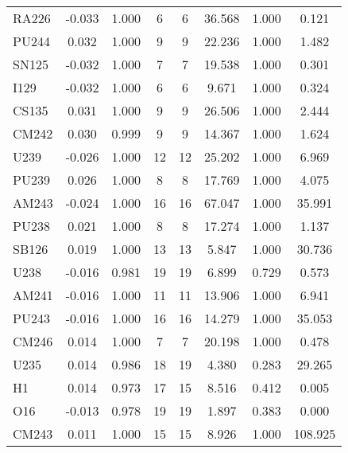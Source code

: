 \begin{tabular}{|l|ccccccc|}
RA226 & -0.033 & 1.000 & 6 & 6 & 36.568 & 1.000 & 0.121\\
PU244 & 0.032 & 1.000 & 9 & 9 & 22.236 & 1.000 & 1.482\\
SN125 & -0.032 & 1.000 & 7 & 7 & 19.538 & 1.000 & 0.301\\
I129 & -0.032 & 1.000 & 6 & 6 & 9.671 & 1.000 & 0.324\\
CS135 & 0.031 & 1.000 & 9 & 9 & 26.506 & 1.000 & 2.444\\
CM242 & 0.030 & 0.999 & 9 & 9 & 14.367 & 1.000 & 1.624\\
U239 & -0.026 & 1.000 & 12 & 12 & 25.202 & 1.000 & 6.969\\
PU239 & 0.026 & 1.000 & 8 & 8 & 17.769 & 1.000 & 4.075\\
AM243 & -0.024 & 1.000 & 16 & 16 & 67.047 & 1.000 & 35.991\\
PU238 & 0.021 & 1.000 & 8 & 8 & 17.274 & 1.000 & 1.137\\
SB126 & 0.019 & 1.000 & 13 & 13 & 5.847 & 1.000 & 30.736\\
U238 & -0.016 & 0.981 & 19 & 19 & 6.899 & 0.729 & 0.573\\
AM241 & -0.016 & 1.000 & 11 & 11 & 13.906 & 1.000 & 6.941\\
PU243 & -0.016 & 1.000 & 16 & 16 & 14.279 & 1.000 & 35.053\\
CM246 & 0.014 & 1.000 & 7 & 7 & 20.198 & 1.000 & 0.478\\
U235 & 0.014 & 0.986 & 18 & 19 & 4.380 & 0.283 & 29.265\\
H1 & 0.014 & 0.973 & 17 & 15 & 8.516 & 0.412 & 0.005\\
O16 & -0.013 & 0.978 & 19 & 19 & 1.897 & 0.383 & 0.000\\
CM243 & 0.011 & 1.000 & 15 & 15 & 8.926 & 1.000 & 108.925\\
\hline
\end{tabular}